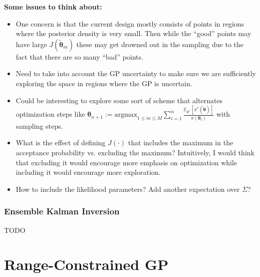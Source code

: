 \documentclass[12pt]{article}
\newcommand{\E}{\mathbb{E}}
\newcommand{\btheta}{\boldsymbol{\theta}}
\begin{document}
\bigskip
\noindent
\textbf{Some issues to think about:}
\begin{itemize}
\item One concern is that the current design mostly consists of points in regions where the posterior density is very small. Then while the ``good'' points may have large $J(\tilde{\btheta}_m)$ these may get 
drowned out in the sampling due to the fact that there are so many ``bad'' points. 
\item Need to take into account the GP uncertainty to make sure we are sufficiently exploring the space in regions where the GP is uncertain. 
\item Could be interesting to explore some sort of scheme that alternates optimization steps like $\btheta_{n + 1} := \text{argmax}_{1 \leq m \leq M} \sum_{i = 1}^{n} \frac{\E_{\Phi^*}\left[\pi^*(\tilde{\btheta})\right]}{\pi(\btheta_i)}$
with sampling steps. 
\item What is the effect of defining $J(\cdot)$ that includes the maximum in the acceptance probability vs. excluding the maximum? Intuitively, I would think that excluding it would encourage more emphasis on 
optimization while including it would encourage more exploration. 
\item How to include the likelihood parameters? Add another expectation over $\Sigma$? 
\end{itemize}


\subsubsection{Ensemble Kalman Inversion}
TODO

\section{Range-Constrained GP}
\end{document}
